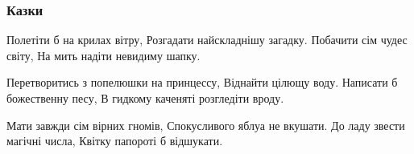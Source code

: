  
 
 

\subsubsection{Казки}

Полетіти б на крилах вітру,
Розгадати найскладнішу загадку.
Побачити сім чудес світу,
На мить надіти невидиму шапку.

Перетворитись з попелюшки на принцессу,
Віднайти цілющу воду.
Написати б божественну песу,
В гидкому каченяті розгледіти вроду.

Мати завжди сім вірних гномів,
Спокусливого яблуа не вкушати.
До ладу звести магічні числа,
Квітку папороті б відшукати.

